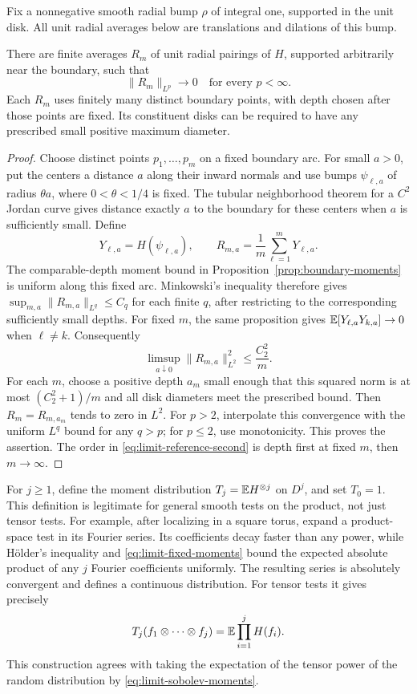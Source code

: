 Fix a nonnegative smooth radial bump \(\rho\) of integral one,
supported in the unit disk.  All unit radial averages below are
translations and dilations of this bump.

\begin{lemma}
\label{limit:references}
There are finite averages \(R_m\) of unit radial pairings of \(H\),
supported arbitrarily near the boundary, such that
\[
       \|R_m\|_{L^p}\longrightarrow0
       \quad\text{for every }p<\infty.
\]
Each \(R_m\) uses finitely many distinct boundary points, with depth
chosen after those points are fixed.  Its constituent disks can be
required to have any prescribed small positive maximum diameter.
\end{lemma}

\begin{proof}
Choose distinct points \(p_1,\ldots,p_m\) on a fixed boundary arc.
For small \(a>0\), put the centers a distance \(a\) along their inward
normals and use bumps \(\psi_{\ell,a}\) of radius \(\theta a\), where
\(0<\theta<1/4\) is fixed.  The tubular neighborhood theorem for a
\(C^2\) Jordan curve gives distance exactly \(a\) to the boundary for
these centers when \(a\) is sufficiently small.  Define
\[
 Y_{\ell,a}=H(\psi_{\ell,a}),\qquad
 R_{m,a}=\frac1m\sum_{\ell=1}^m Y_{\ell,a}.
\]
The comparable-depth moment bound in
Proposition~\ref{prop:boundary-moments} is uniform along this fixed
arc.  Minkowski's inequality therefore gives
\(\sup_{m,a}\|R_{m,a}\|_{L^q}\le C_q\) for each finite \(q\), after
restricting to the corresponding sufficiently small depths.
For fixed \(m\), the same proposition gives
\(\mathbb E[Y_{\ell,a}Y_{k,a}]\to0\) when \(\ell\ne k\).
Consequently
\begin{equation}
  \limsup_{a\downarrow0}\|R_{m,a}\|_{L^2}^2
       \le \frac{C_2^2}{m}.
  \label{eq:limit-reference-second}
\end{equation}
For each \(m\), choose a positive depth \(a_m\) small enough that this
squared norm is at most \((C_2^2+1)/m\) and all disk diameters meet
the prescribed bound.  Then \(R_m=R_{m,a_m}\) tends to zero in
\(L^2\).  For \(p>2\), interpolate this convergence with the uniform
\(L^q\) bound for any \(q>p\); for \(p\le2\), use monotonicity.
This proves the assertion.  The order in
\eqref{eq:limit-reference-second} is depth first at fixed \(m\),
then \(m\to\infty\).
\end{proof}

For \(j\ge1\), define the moment distribution \(T_j=\mathbb E H^{\otimes j}\)
on \(D^j\), and set \(T_0=1\).  This definition is legitimate for
general smooth tests on the product, not just tensor tests.
For example, after localizing in a square torus, expand a product-space
test in its Fourier series.  Its coefficients decay faster than any
power, while H\"older's inequality and
\eqref{eq:limit-fixed-moments} bound the expected absolute product of
any \(j\) Fourier coefficients uniformly.  The resulting series is
absolutely convergent and defines a continuous distribution.
For tensor tests it gives precisely
\[
 T_j(f_1\otimes\cdots\otimes f_j)
       =\mathbb E\prod_{i=1}^j H(f_i).
\]
This construction agrees with taking the expectation of the tensor
power of the random distribution by
\eqref{eq:limit-sobolev-moments}.

